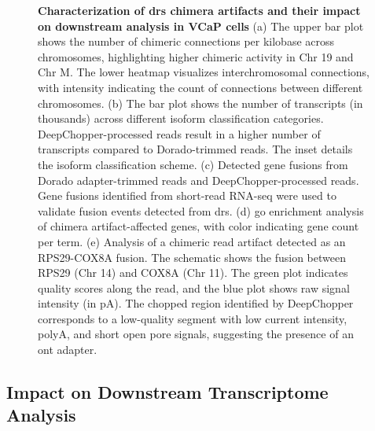 \documentclass[pdflatex,sn-nature, lineno]{sn-jnl}%
\begin{document}
\begin{figure}[!ht]
	\caption{{\bf Characterization of \gls{drs} chimera artifacts and their impact on downstream analysis in VCaP cells} (a) The upper bar plot shows the number of chimeric connections per kilobase across chromosomes, highlighting higher chimeric activity in Chr 19 and Chr M. The lower heatmap visualizes interchromosomal connections, with intensity indicating the count of connections between different chromosomes. (b) The bar plot shows the number of transcripts (in thousands) across different isoform classification categories. DeepChopper-processed reads result in a higher number of transcripts compared to Dorado-trimmed reads. The inset details the isoform classification scheme. (c) Detected gene fusions from Dorado adapter-trimmed reads and DeepChopper-processed reads. Gene fusions identified from short-read RNA-seq were used to validate fusion events detected from \gls{drs}. (d) \gls{go} enrichment analysis of chimera artifact-affected genes, with color indicating gene count per term. (e) Analysis of a chimeric read artifact detected as an RPS29-COX8A fusion. The schematic shows the fusion between RPS29 (Chr 14) and COX8A (Chr 11). The green plot indicates quality scores along the read, and the blue plot shows raw signal intensity (in pA). The chopped region identified by DeepChopper corresponds to a low-quality segment with low current intensity, polyA, and short open pore signals, suggesting the presence of an \gls{ont} adapter.}\label{fig:f3}
\end{figure}


\subsection{Impact on Downstream Transcriptome Analysis}
\end{document}
